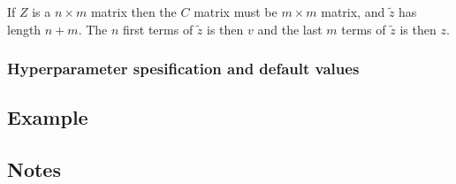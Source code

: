 \documentclass[a4paper,11pt]{article}
\begin{document}
If $Z$ is a $n\times m$ matrix then the $C$ matrix must be $m\times m$
matrix, and $\widetilde z$ has length $n+m$. The $n$ first terms of
$\widetilde z$ is then $v$ and the last $m$ terms of $\widetilde z$
is then $z$.

\subsubsection*{Hyperparameter spesification and default values}



\subsection*{Example}

\subsection*{Notes}
\end{document}
